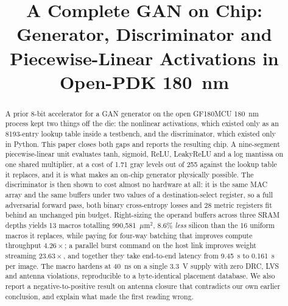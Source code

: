 \documentclass[conference,a4paper]{APSIPA2026}
\begin{document}
\title{A Complete GAN on Chip: Generator, Discriminator and\\Piecewise-Linear Activations in Open-PDK 180~nm}

\author{
}

\maketitle
\thispagestyle{firststyle}
\pagestyle{empty}

\begin{abstract}
A prior 8-bit accelerator for a GAN generator on the open GF180MCU 180~nm process kept two things off the die: the nonlinear activations, which existed only as an 8193-entry lookup table inside a testbench, and the discriminator, which existed only in Python. This paper closes both gaps and reports the resulting chip. A nine-segment piecewise-linear unit evaluates tanh, sigmoid, ReLU, LeakyReLU and a log mantissa on one shared multiplier, at a cost of 1.71 gray levels out of 255 against the lookup table it replaces, and it is what makes an on-chip generator physically possible. The discriminator is then shown to cost almost no hardware at all: it is the same MAC array and the same buffers under two values of a destination-select register, so a full adversarial forward pass, both binary cross-entropy losses and 28 metric registers fit behind an unchanged pin budget. Right-sizing the operand buffers across three SRAM depths yields 13 macros totalling 990{,}581~$\mu$m$^2$, 8.6\% \emph{less} silicon than the 16 uniform macros it replaces, while paying for four-way batching that improves compute throughput $4.26\times$; a parallel burst command on the host link improves weight streaming $23.63\times$, and together they take end-to-end latency from 9.45~s to 0.161~s per image. The macro hardens at 40~ns on a single 3.3~V supply with zero DRC, LVS and antenna violations, reproducible to a byte-identical placement database. We also report a negative-to-positive result on antenna closure that contradicts our own earlier conclusion, and explain what made the first reading wrong.
\end{abstract}
\end{document}
